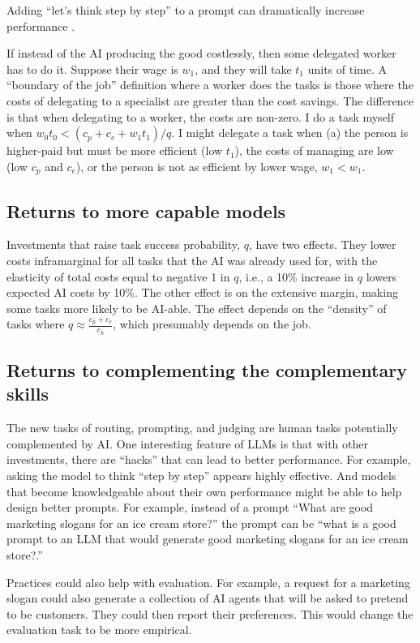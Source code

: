 \documentclass{article}
\begin{document}
Adding ``let's think step by step'' to a prompt can dramatically increase performance \citep{kojima2023large}.

If instead of the AI producing the good costlessly, then some delegated worker has to do it. 
Suppose their wage is $w_1$, and they will take $t_1$ units of time.
A ``boundary of the job'' definition where a worker does the tasks is those where the costs of delegating to a specialist are greater than the cost savings. 
The difference is that when delegating to a worker, the costs are non-zero.
I do a task myself when $w_{0} t_{0} < (c_p + c_e + w_{1} t_{1})/q$.
I might delegate a task when (a) the person is higher-paid but must be more efficient (low $t_{1}$), the costs of managing are low (low $c_p$ and $c_e$), or the person is not as efficient by lower wage, $w_{1} < w_{1}$.

\subsection{Returns to more capable models}
Investments that raise task success probability, $q$, have two effects. 
They lower costs inframarginal for all tasks that the AI was already used for, with the elasticity of total costs equal to negative 1 in $q$, i.e., a 10\% increase in $q$ lowers expected AI costs by 10\%. 
The other effect is on the extensive margin, making some tasks more likely to be AI-able. 
The effect depends on the ``density'' of tasks where $q \approx \frac{c_p + c_e}{c_h}$, which presumably depends on the job.

\subsection{Returns to complementing the complementary skills}
The new tasks of routing, prompting, and judging are human tasks potentially complemented by AI. 
One interesting feature of LLMs is that with other investments, there are ``hacks'' that can lead to better performance. For example, asking the model to think ``step by step'' appears highly effective. 
And models that become knowledgeable about their own performance might be able to help design better prompts. 
For example, instead of a prompt ``What are good marketing slogans for an ice cream store?'' the prompt can be  ``what is a good prompt to an LLM that would generate good marketing slogans for an ice cream store?.''

Practices could also help with evaluation. 
For example, a request for a marketing slogan could also generate a collection of AI agents that will be asked to pretend to be customers.
They could then report their preferences. 
This would change the evaluation task to be more empirical. 
\end{document}
